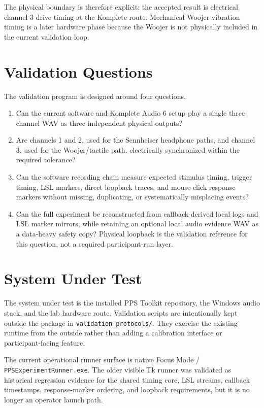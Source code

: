 \documentclass[11pt]{article}
\begin{document}
The physical boundary is therefore explicit: the accepted result is electrical
channel-3 drive timing at the Komplete route. Mechanical Woojer vibration
timing is a later hardware phase because the Woojer is not physically included
in the current validation loop.

\section{Validation Questions}

The validation program is designed around four questions.

\begin{enumerate}
  \item Can the current software and Komplete Audio 6 setup play a single
  three-channel WAV as three independent physical outputs?
  \item Are channels 1 and 2, used for the Sennheiser headphone paths, and
  channel 3, used for the Woojer/tactile path, electrically synchronized within
  the required tolerance?
  \item Can the software recording chain measure expected stimulus timing,
  trigger timing, LSL markers, direct loopback traces, and mouse-click response
  markers without missing, duplicating, or systematically misplacing events?
  \item Can the full experiment be reconstructed from callback-derived local
  logs and LSL marker mirrors, while retaining an optional local audio evidence
  WAV as a data-heavy safety copy? Physical loopback is the validation reference
  for this question, not a required participant-run layer.
\end{enumerate}

\section{System Under Test}

The system under test is the installed PPS Toolkit repository, the Windows
audio stack, and the lab hardware route. Validation scripts are intentionally
kept outside the package in \texttt{validation\_protocols/}. They exercise the
existing runtime from the outside rather than adding a calibration interface or
participant-facing feature.

The current operational runner surface is native Focus Mode /
\texttt{PPSExperimentRunner.exe}. The older visible Tk runner was validated as
historical regression evidence for the shared timing core, LSL streams,
callback timestamps, response-marker ordering, and loopback requirements, but
it is no longer an operator launch path.
\end{document}
